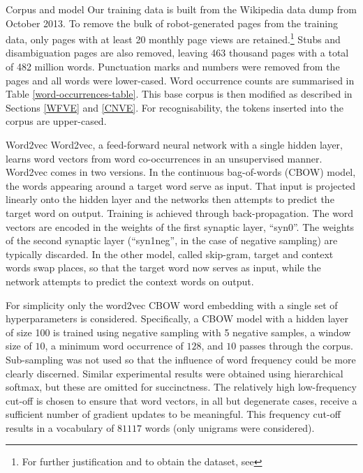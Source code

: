 \documentclass{article} %
\begin{document}
\begin{section}{Corpus and model}\label{corpus-and-model}
Our training data is built from the Wikipedia data dump from October
2013.  To remove the bulk of robot-generated pages from the training
data, only pages with at least 20 monthly page views are
retained.\footnote{For further justification and to obtain the dataset,
  see \blogpost} Stubs and disambiguation pages are also removed,
leaving 463 thousand pages with a total of 482 million words.
Punctuation marks and numbers were removed from the pages and all words
were lower-cased.  Word occurrence counts are summarised 
in Table \ref{word-occurrences-table}.  This base corpus is then
modified as described in Sections \ref{WFVE} and \ref{CNVE}.  For
recognisability, the tokens inserted into the corpus are upper-cased.

\begin{subsection}{Word2vec}\label{word2vec}
Word2vec, a feed-forward neural network with a single hidden
layer, learns word vectors from word co-occurrences in an unsupervised
manner.  Word2vec comes in two versions.  In the continuous bag-of-words
(CBOW) model, the words appearing around a target word serve as input.
That input is projected linearly onto the hidden layer and the networks
then attempts to predict the target word on output.  Training is
achieved through back-propagation.  The word vectors are encoded in the
weights of the first synaptic layer, ``syn0''.  The weights of the
second synaptic layer (``syn1neg'', in the case of negative sampling) are typically discarded.  In the other model,
called skip-gram, target and context words swap places, so that the
target word now serves as input, while the network attempts to predict
the context words on output.

For simplicity only the word2vec CBOW word embedding with a single set
of hyperparameters is considered.  Specifically, a CBOW model with a
hidden layer of size 100 is trained using negative sampling with 5
negative samples, a window size of $10$, a minimum word occurrence of
$128$, and $10$ passes through the corpus.  Sub-sampling was not used so
that the influence of word frequency could be more clearly discerned.
Similar experimental results were obtained using hierarchical softmax,
but these are omitted for succinctness.  The relatively high
low-frequency cut-off is chosen to ensure that word vectors, in all but
degenerate cases, receive a sufficient number of gradient updates to be
meaningful.  This frequency cut-off results in a vocabulary of $81117$
words (only unigrams were considered).


\end{subsection}
\end{section}
\end{document}
